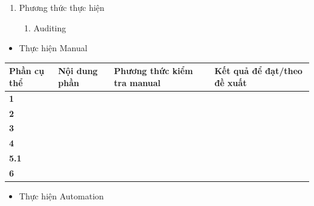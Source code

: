 \begin{enumerate}
\def\labelenumi{\arabic{enumi}.}
\setcounter{enumi}{1}
\item
  Phương thức thực hiện

  \begin{enumerate}
  \def\labelenumii{\arabic{enumii}.}
  \item
    Auditing
  \end{enumerate}
\end{enumerate}

\begin{itemize}
\item
  Thực hiện Manual
\end{itemize}

{\def\LTcaptype{none} %
\begin{longtable}[]{@{}
  >{\raggedright\arraybackslash}p{}
  >{\raggedright\arraybackslash}p{}
  >{\raggedright\arraybackslash}p{}
  >{\raggedright\arraybackslash}p{}@{}}
\toprule\noalign{}
\begin{minipage}[b]{\linewidth}\raggedright
\textbf{Phần cụ thể}
\end{minipage} & \begin{minipage}[b]{\linewidth}\raggedright
\textbf{Nội dung phần}
\end{minipage} & \begin{minipage}[b]{\linewidth}\raggedright
\textbf{Phương thức kiểm tra manual}
\end{minipage} & \begin{minipage}[b]{\linewidth}\raggedright
\textbf{Kết quả để đạt/theo đề xuất}
\end{minipage} \\
\midrule\noalign{}
\endhead
\bottomrule\noalign{}
\endlastfoot
\textbf{1} & & & \\
\textbf{2} & & & \\
\textbf{3} & & & \\
\textbf{4} & & & \\
\textbf{5.1} & & & \\
\textbf{6} & & & \\
\end{longtable}
}

\begin{itemize}
\item
  Thực hiện Automation
\end{itemize}

